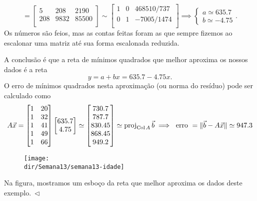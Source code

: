 \documentclass[../livro.tex]{subfiles}  %
\providecommand{\dir}{..}
\begin{document}
\begin{example}
  \begin{equation}
  [\, A^TA \ | \ \vec{b} \, ] =
  \begin{bmatrix}
    5    & 208 & 2190 \\
    208  & 9832 & 85500 \\
  \end{bmatrix} \sim
  \begin{bmatrix}
    1 & 0 & 468510/737 \\
    0 & 1 & -7005/1474 \\
  \end{bmatrix} \implies
  \left\{
    \begin{array}{ll}
      a \simeq 635.7 \\
      b \simeq -4.75
    \end{array}
  \right..
  \end{equation} Os números são feios, mas as contas feitas foram as que sempre fizemos ao escalonar uma matriz até sua forma escalonada reduzida.

  A conclusão é que a reta de mínimos quadrados que melhor aproxima os nossos dados é a reta
  \begin{equation}
  y = a + b x = 635.7 - 4.75 x.
  \end{equation} O erro de mínimos quadrados nesta aproximação (ou norma do resíduo) pode ser calculado como
  \begin{equation}
  A \vec{x} = \begin{bmatrix}
    1 & 20 \\
    1 & 32 \\
    1 & 41 \\
    1 & 49 \\
    1 & 66 \\
  \end{bmatrix}
  \begin{bmatrix}
    635.7 \\
    4.75 \\
  \end{bmatrix} \simeq
  \begin{bmatrix}
    730.7 \\
    787.7 \\
    830.45 \\
    868.45 \\
    949.2 \\
  \end{bmatrix} \simeq \operatorname{proj}_{\operatorname{Col} A} \vec{b} \implies \text{ erro } = \| \vec{b} - A\vec{x} \| \simeq 947.3
  \end{equation}
  \begin{figure}[h!]
    \begin{center}
      \texttt{[image: \\dir/Semana13/semana13-idade]}
    \end{center}
  \end{figure}
 Na figura, mostramos um esboço da reta que melhor aproxima os dados deste exemplo$. \ \lhd$
\end{example}
\end{document}

